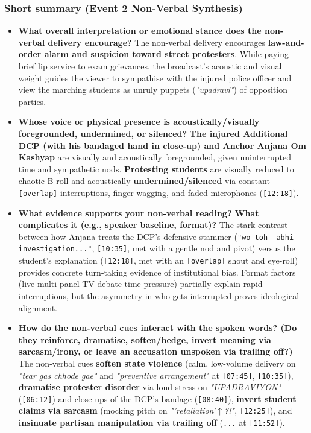 \documentclass[10pt,a4paper]{article}
\begin{document}
\subsubsection*{Short summary (Event 2 Non-Verbal Synthesis)}

\begin{itemize}
  \item \textbf{What overall interpretation or emotional stance does the non-verbal delivery encourage?}
The non-verbal delivery encourages \textbf{law-and-order alarm and suspicion toward street protesters}. While paying brief lip service to exam grievances, the broadcast's acoustic and visual weight guides the viewer to sympathise with the injured police officer and view the marching students as unruly puppets (\textit{"upadravi"}) of opposition parties.\par\smallskip
  \item \textbf{Whose voice or physical presence is acoustically/visually foregrounded, undermined, or silenced?}
\textbf{The injured Additional DCP (with his bandaged hand in close-up) and Anchor Anjana Om Kashyap} are visually and acoustically foregrounded, given uninterrupted time and sympathetic nods. \textbf{Protesting students} are visually reduced to chaotic B-roll and acoustically \textbf{undermined/silenced} via constant \texttt{[overlap]} interruptions, finger-wagging, and faded microphones (\texttt{[12:18]}).\par\smallskip
  \item \textbf{What evidence supports your non-verbal reading? What complicates it (e.g., speaker baseline, format)?}
The stark contrast between how Anjana treats the DCP's defensive stammer (\texttt{"wo toh--- abhi investigation..."}, \texttt{[10:35]}, met with a gentle nod and pivot) versus the student's explanation (\texttt{[12:18]}, met with an \texttt{[overlap]} shout and eye-roll) provides concrete turn-taking evidence of institutional bias. Format factors (live multi-panel TV debate time pressure) partially explain rapid interruptions, but the asymmetry in who gets interrupted proves ideological alignment.\par\smallskip
  \item \textbf{How do the non-verbal cues interact with the spoken words? (Do they reinforce, dramatise, soften/hedge, invert meaning via sarcasm/irony, or leave an accusation unspoken via trailing off?)}
The non-verbal cues \textbf{soften state violence} (calm, low-volume delivery on \textit{"tear gas chhode gae"} and \textit{"preventive arrangement"} at \texttt{[07:45]}, \texttt{[10:35]}), \textbf{dramatise protester disorder} via loud stress on \textit{"UPADRAVIYON"} (\texttt{[06:12]}) and close-ups of the DCP's bandage (\texttt{[08:40]}), \textbf{invert student claims via sarcasm} (mocking pitch on \textit{"'retaliation'$\uparrow$?!"}, \texttt{[12:25]}), and \textbf{insinuate partisan manipulation via trailing off} (\texttt{...} at \texttt{[11:52]}).\par\smallskip

\end{itemize}
\end{document}
